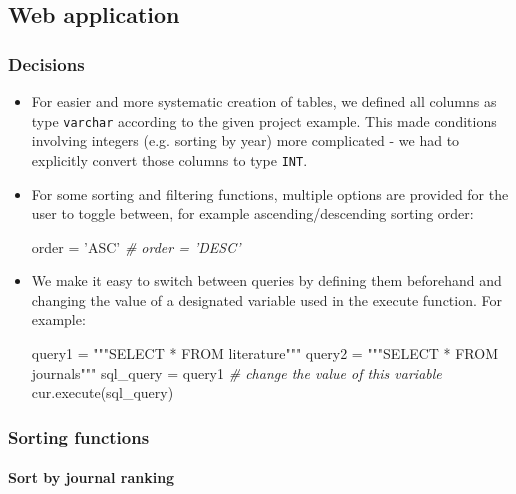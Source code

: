 \documentclass[11pt]{article}
\newenvironment{Shaded}{}{}
\newcommand{\StringTok}[1]{\textcolor[rgb]{0.25,0.44,0.63}{{#1}}}
\newcommand{\CommentTok}[1]{\textcolor[rgb]{0.38,0.63,0.69}{\textit{{#1}}}}
\newcommand{\NormalTok}[1]{{#1}}
\newcommand{\OperatorTok}[1]{\textcolor[rgb]{0.40,0.40,0.40}{{#1}}}
\begin{document}
    \subsection{Web application}\label{web-application}

\subsubsection{Decisions}\label{decisions}

\begin{itemize}
\item
  For easier and more systematic creation of tables, we defined all
  columns as type \texttt{varchar} according to the given project
  example. This made conditions involving integers (e.g. sorting by
  year) more complicated - we had to explicitly convert those columns to
  type \texttt{INT}.
\item
  For some sorting and filtering functions, multiple options are
  provided for the user to toggle between, for example
  ascending/descending sorting order:

\begin{Shaded}
\begin{Highlighting}[]
\NormalTok{order }\OperatorTok{=} \StringTok{'ASC'}
\CommentTok{# order = 'DESC'}
\end{Highlighting}
\end{Shaded}
\item
  We make it easy to switch between queries by defining them beforehand
  and changing the value of a designated variable used in the execute
  function. For example:

\begin{Shaded}
\begin{Highlighting}[]
\NormalTok{query1 }\OperatorTok{=} \StringTok{"""SELECT * FROM literature"""}
\NormalTok{query2 }\OperatorTok{=} \StringTok{"""SELECT * FROM journals"""}
\NormalTok{sql_query }\OperatorTok{=}\NormalTok{ query1 }\CommentTok{# change the value of this variable}
\NormalTok{cur.execute(sql_query)}
\end{Highlighting}
\end{Shaded}
\end{itemize}

    \subsubsection{Sorting functions}\label{sorting-functions}

\paragraph{Sort by journal ranking}\label{sort-by-journal-ranking}
\end{document}
